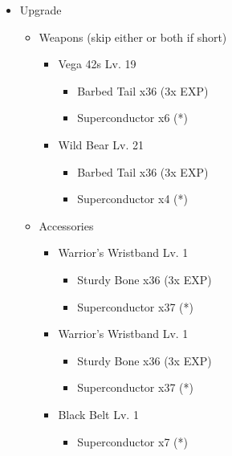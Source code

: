 \begin{upgrade}
		\begin{itemize}
			\item Upgrade
			      \begin{itemize}
				      \item Weapons (skip either or both if short)
				            \begin{itemize}
					            \item Vega 42s Lv. 19
					                  \begin{itemize}
						                  \item Barbed Tail x36 (3x EXP)
						                  \item Superconductor x6 (*)
					                  \end{itemize}
					            \item Wild Bear Lv. 21
					                  \begin{itemize}
						                  \item Barbed Tail x36 (3x EXP)
						                  \item Superconductor x4 (*)
					                  \end{itemize}
				            \end{itemize}
				      \item Accessories
				            \begin{itemize}
					            \item Warrior's Wristband Lv. 1
					                  \begin{itemize}
						                  \item Sturdy Bone x36 (3x EXP)
						                  \item Superconductor x37 (*)
					                  \end{itemize}
					            \item Warrior's Wristband Lv. 1
					                  \begin{itemize}
						                  \item Sturdy Bone x36 (3x EXP)
						                  \item Superconductor x37 (*)
					                  \end{itemize}
					            \item Black Belt Lv. 1
					                  \begin{itemize}
						                  \item Superconductor x7 (*)
					                  \end{itemize}
				            \end{itemize}
			      \end{itemize}
		\end{itemize}
\end{upgrade}
